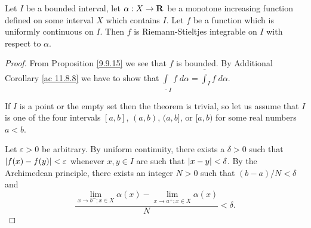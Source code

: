 \begin{additional corollary}\label{ac 11.8.15}
Let \(I\) be a bounded interval, let \(\alpha : X \to \mathbf{R}\) be a monotone increasing function defined on some interval \(X\) which contains \(I\).
Let \(f\) be a function which is uniformly continuous on \(I\).
Then \(f\) is Riemann-Stieltjes integrable on \(I\) with respect to \(\alpha\).
\end{additional corollary}

\begin{proof}
    From Proposition \ref{9.9.15} we see that \(f\) is bounded.
    By Additional Corollary \ref{ac 11.8.8} we have to show that \(\underline{\int}_I f \; d \alpha = \overline{\int}_I f \; d \alpha\).

    If \(I\) is a point or the empty set then the theorem is trivial, so let us assume that \(I\) is one of the four intervals \([a, b]\), \((a, b)\), \((a, b]\), or \([a, b)\) for some real numbers \(a < b\).

    Let \(\varepsilon > 0\) be arbitrary.
    By uniform continuity, there exists a \(\delta > 0\) such that \(\left\lvert f(x) - f(y)\right\rvert < \varepsilon\) whenever \(x, y \in I\) are such that \(\left\lvert x - y\right\rvert < \delta\).
    By the Archimedean principle, there exists an integer \(N > 0\) such that \((b - a) / N < \delta\) and
    \[
        \frac{\lim_{x \to b^- ; x \in X} \alpha(x) - \lim_{x \to a^+ ; x \in X} \alpha(x)}{N} < \delta.
    \]


\end{proof}
